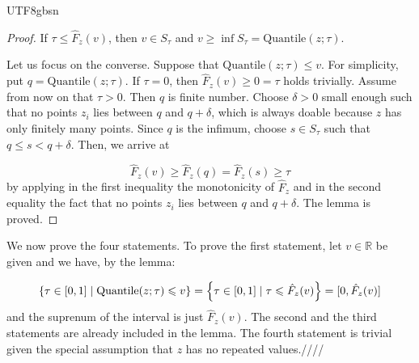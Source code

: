 \documentclass[../main.tex]{subfiles}
\begin{document}
\begin{CJK*}{UTF8}{gbsn}
\begin{proof}
If $\tau \leqslant \hat{F}_z(v)$, then $v \in S_{\tau}$ 
and $v \geqslant \inf S_{\tau} = \text{Quantile}(z; \tau)$.

Let us focus on the converse.
Suppose that $\text{Quantile}(z; \tau) \leqslant v$.
For simplicity, put $q = \text{Quantile}(z; \tau)$.
If $\tau = 0$, then $\hat{F}_z(v) \geqslant 0 = \tau$ holds trivially.
Assume from now on that $\tau > 0$.
Then $q$ is finite number.
Choose $\delta > 0$ small enough such that no points 
$z_i$ lies between $q$ and $q + \delta$,
which is always doable because $z$ has only finitely many points.
Since $q$ is the infimum,
choose $s \in S_{\tau}$ such that $q \leqslant s < q + \delta$.
Then, we arrive at 

\begin{equation*}
  \hat{F}_z(v) \geqslant \hat{F}_z(q) = \hat{F}_z(s) \geqslant \tau
\end{equation*}
by applying in the first inequality the monotonicity of $\hat{F}_z$ 
and in the second equality the fact that no points $z_i$ lies between $q$ and $q + \delta$.
The lemma is proved.
\end{proof}

We now prove the four statements.
To prove the first statement, 
let $v \in \mathbb{R}$ be given 
and we have, by the lemma:

\begin{equation*}
  \left \{ \tau \in [0,1] \mid \text{Quantile}(z; \tau) \leqslant v \right \}
  = \left \{ \tau \in [0,1] \mid \tau \leqslant \hat{F}_z(v) \right \} = [0, \hat{F}_z(v)]
\end{equation*}
and the suprenum of the interval is just $\hat{F}_z(v)$.
The second and the third statements are already included in the lemma.
The fourth statement is trivial given the 
special assumption that $z$ has no repeated values.////
\end{CJK*}
\end{document}
